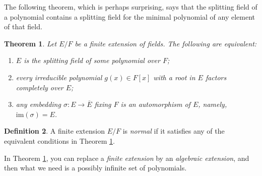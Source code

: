 \documentclass[12pt]{report}
\newtheorem{thm}{Theorem}[section]
\newtheorem{lemma}[thm]{Lemma}
\theoremstyle{definition}
\newtheorem{defn}[thm]{Definition}
\def\im{\text{im}}
\def\bb{\beta}
\begin{document}
The following theorem, which is perhaps surprising, says that the splitting field of a polynomial contains a splitting field for the minimal polynomial of any element of that field.

\begin{thm}\label{normal}
    Let $E/F$ be a finite extension of fields. The following are equivalent:
    \begin{enumerate}
        \item $E$ is the splitting field of some polynomial over $F$;
        \item every irreducible polynomial $g(x)\in F[x]$ with a root in $E$ factors completely over $E$;
        \item any embedding $\sigma: E\to \overline{E}$ fixing $F$ is an automorphism of $E$, namely, $\im(\sigma)=E$.
    \end{enumerate}
\end{thm}

\begin{defn}
    A finite extension $E/F$ is \emph{normal} if it satisfies any of the equivalent conditions in Theorem \ref{normal}.
\end{defn}

\begin{remark}
    In Theorem \ref{normal}, you can replace a \emph{finite extension} by an \emph{algebraic extension}, and then what we need is a possibly infinite set of polynomials.
\end{remark}


    
\end{document}
